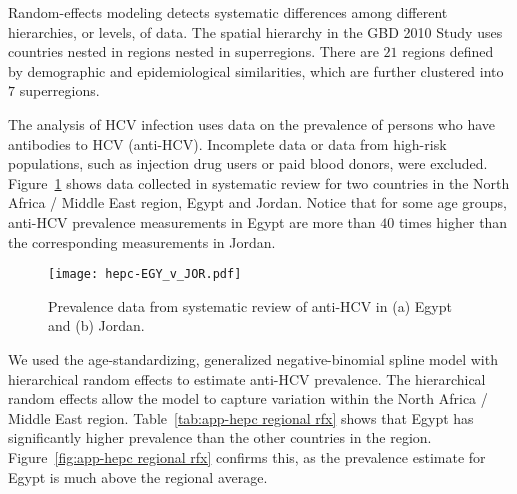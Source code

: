 Random-effects modeling detects systematic differences among different
hierarchies, or levels, of data.  The spatial hierarchy in the GBD
2010 Study uses countries nested in regions nested in superregions.
There are $21$ regions defined by demographic and epidemiological
similarities, which are further clustered into $7$ superregions.

The analysis of HCV infection uses data on the prevalence of persons who
have antibodies to HCV (anti-HCV).  Incomplete data or data from high-risk
populations, such as injection drug users or paid blood donors, were excluded.
Figure~\ref{fig:app-hepc data} shows data collected in systematic
review for two countries in the North Africa / Middle East region, Egypt
and Jordan.  Notice that for some age groups, anti-HCV prevalence
measurements in Egypt are more than $40$ times higher than the corresponding measurements in
Jordan.

    \begin{figure}[h]
        \begin{center}
            \texttt{[image: hepc-EGY\_v\_JOR.pdf]}
            \caption{Prevalence data from systematic review of
              anti-HCV in (a) Egypt and (b) Jordan.}
            \label{fig:app-hepc data}
        \end{center}
    \end{figure}

We used the age-standardizing, generalized negative-binomial spline
model with hierarchical random effects to estimate anti-HCV prevalence.  The
hierarchical random effects allow the model to capture variation
within the North Africa / Middle East region.
Table~\ref{tab:app-hepc regional rfx} shows that Egypt has significantly
higher prevalence than the other countries in the region.
Figure~\ref{fig:app-hepc regional rfx} confirms this, as the prevalence
estimate for Egypt is much above the regional average.

